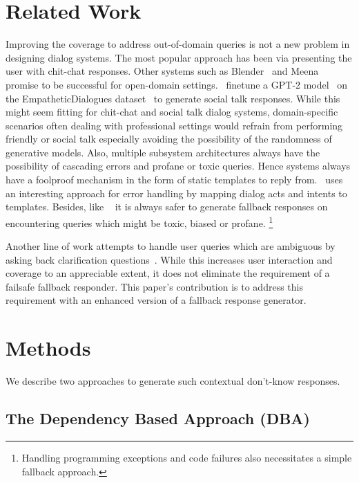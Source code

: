 \documentclass[11pt,a4paper]{article}
\begin{document}
\section{Related Work}
Improving the coverage to address out-of-domain queries is not a new problem in designing dialog systems. The most popular approach has been via presenting the user with chit-chat responses. Other systems such as Blender~\cite{roller2020recipes} and Meena~\cite{adiwardana2020humanlike} promise to be successful for open-domain settings.~\citet{paranjape2020neural} finetune a GPT-2 model~\cite{radford2019language} on the EmpatheticDialogues dataset~\cite{rashkin2019empathetic} to generate social talk responses. While this might seem fitting for chit-chat and social talk dialog systems, domain-specific scenarios often dealing with professional settings would refrain from performing friendly or social talk especially avoiding the possibility of the randomness of generative models. Also, multiple subsystem architectures always have the possibility of cascading errors and profane or toxic queries. Hence systems always have a foolproof mechanism in the form of static templates to reply from.~\citet{liang2020gunrock} uses an interesting approach for error handling by mapping dialog acts and intents to templates. Besides, like ~\citet{finch2020emora} it is always safer to generate fallback responses on encountering queries which might be toxic, biased or profane. \footnote{Handling programming exceptions and code failures also necessitates a simple fallback approach.}

Another line of work attempts to handle user queries which are ambiguous by asking back clarification questions~\cite{dhole2020resolving, zamani2020generating, yu-etal-2020-interactive}. While this increases user interaction and coverage to an appreciable extent, it does not eliminate the requirement of a failsafe fallback responder. 
This paper's contribution is to address this requirement with an enhanced version of a fallback response generator.

\section{Methods}
We describe two approaches to generate such contextual don't-know responses.

\subsection{The Dependency Based Approach (DBA)}
\end{document}
